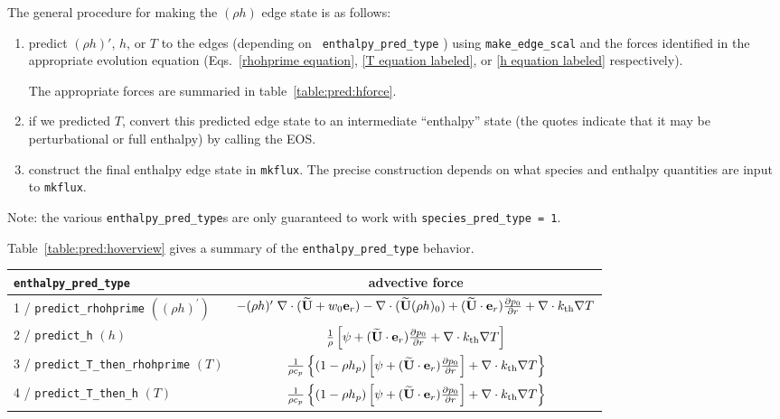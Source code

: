 The general procedure for making the $(\rho h)$ edge state is as follows:
\begin{enumerate}
\item predict $(\rho h)'$, $h$, or $T$ to the edges (depending on {\tt
  enthalpy\_pred\_type} ) using {\tt make\_edge\_scal} and the forces
  identified in the appropriate evolution equation
  (Eqs.~\ref{rhohprime equation}, \ref{T equation labeled}, or \ref{h
    equation labeled} respectively).

  The appropriate forces are summaried in table~\ref{table:pred:hforce}.

\item if we predicted $T$, convert this predicted
  edge state to an intermediate ``enthalpy'' state (the quotes
  indicate that it may be perturbational or full enthalpy) by calling
  the EOS.
 
\item construct the final enthalpy edge state in {\tt mkflux}.  The
  precise construction depends on what species and enthalpy quantities
  are input to {\tt mkflux}.

\end{enumerate}

\noindent Note: the various {\tt enthalpy\_pred\_type}s are only
guaranteed to work with {\tt species\_pred\_type = 1}.

Table~\ref{table:pred:hoverview}
gives a summary
of the {\tt enthalpy\_pred\_type} behavior.


\begin{table*}[h]
\centering
\caption{Forcing term into {\tt make\_edge\_scal} \newline}
\label{table:pred:hforce}
\renewcommand{\arraystretch}{1.5}
\begin{tabular}{l|c}
\hline
\hline
{\tt enthalpy\_pred\_type} &   {advective force} \\
\hline
1 / {\tt predict\_rhohprime} $((\rho h)^\prime)$ &  
 $-(\rho h)^\prime \; \nabla \cdot (\widetilde{{\bf U}}+w_0 \mathbf{e}_r) - 
 \nabla \cdot (\widetilde{{\bf U}} (\rho h)_0) + (\widetilde{{\bf U}} \cdot \mathbf{e}_r) \frac{\partial p_0}{\partial r} + \nabla \cdot k_{\rm th} \nabla T$ \\
2 / {\tt predict\_h}  $(h)$ & $\frac{1}{\rho} \left [\psi + (\widetilde{{\bf U}} \cdot \mathbf{e}_r)
  \frac{\partial p_0}{\partial r} + \nabla \cdot k_{\rm th} \nabla T \right ]$ \\
3 / {\tt predict\_T\_then\_rhohprime} $(T)$ & $\frac{1}{\rho c_p} \left \{ (1 - \rho h_p) 
   \left [\psi + (\widetilde{{\bf U}} \cdot \mathbf{e}_r) \frac{\partial p_0}{\partial r} \right ] + \nabla \cdot k_{\rm th} \nabla T \right \}$ \\
4 / {\tt predict\_T\_then\_h}  $(T)$ & $\frac{1}{\rho c_p} \left\{ (1 - \rho h_p) \left [\psi + (\widetilde{{\bf U}} \cdot \mathbf{e}_r)
\frac{\partial p_0}{\partial r}\right ] +  \nabla \cdot k_{\rm th} \nabla T \right\}$ \\
\hline
\end{tabular}
\end{table*}


